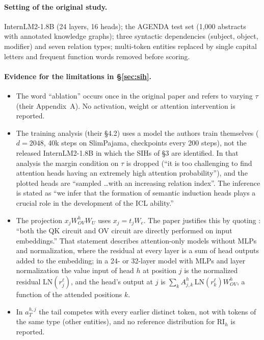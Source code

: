\paragraph{Setting of the original study.}
InternLM2-1.8B (24 layers, 16 heads); the AGENDA test set (1,000 abstracts with
annotated knowledge graphs); three syntactic dependencies (subject, object,
modifier) and seven relation types; multi-token entities replaced by single capital
letters and frequent function words removed before scoring.

\paragraph{Evidence for the limitations in \S\ref{sec:sih}.}
\begin{itemize}\setlength\itemsep{1pt}
\item[(i)] The word ``ablation'' occurs once in the original paper and refers to
varying $\tau$ (their Appendix~A). No activation, weight or attention intervention is
reported.
\item[(ii)] The training analysis (their \S4.2) uses a model the authors train
themselves ($d{=}2048$, 40k steps on SlimPajama, checkpoints every 200 steps), not
the released InternLM2-1.8B in which the SIHs of \S3 are identified. In that analysis
the margin condition on $\tau$ is dropped (``it is too challenging to find attention
heads having an extremely high attention probability''), and the plotted heads are
``sampled \ldots with an increasing relation index''. The inference is stated as
``we infer that the formation of semantic induction heads plays a crucial role in the
development of the ICL ability.''
\item[(iii)] The projection $x_j W^h_{OV} W_U$ uses $x_j=t_j W_e$. The paper justifies
this by quoting \citet{elhage2021mathematical}: ``both the QK circuit and OV circuit
are directly performed on input embeddings.'' That statement describes attention-only
models without MLPs and normalization, where the residual at every layer is a sum of
head outputs added to the embedding; in a 24- or 32-layer model with MLPs and
layer normalization the value input of head $h$ at position $j$ is the normalized
residual $\mathrm{LN}(r^{\ell}_j)$, and the head's output at $j$ is
$\sum_k A^h_{j,k}\,\mathrm{LN}(r^{\ell}_k)W^h_{OV}$, a function of the attended
positions $k$.
\item[(iv)] In $a^{h,j}_T$ the tail competes with every earlier distinct token, not
with tokens of the same type (other entities), and no reference distribution for
$\mathrm{RI}_h$ is reported.
\end{itemize}

